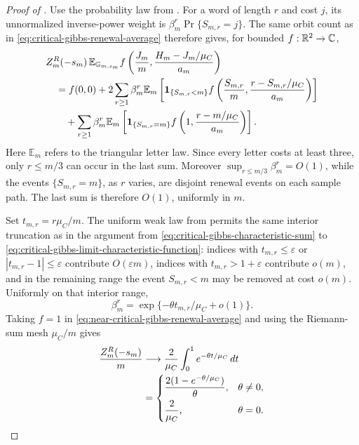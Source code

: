 \begin{proof}[Proof of ]
Use the probability law from .  For a
word of length \(r\) and cost \(j\), its unnormalized inverse-power weight is
\(\beta_m^r\Pr\{S_{m,r}=j\}\).  The same orbit count as in
\eqref{eq:critical-gibbs-renewal-average} therefore gives, for bounded
\(f:\mathbb{R}^2\to\mathbb C\),
\begin{align}
 &Z_m^R(-s_m)\,\mathbb E_{\mathbb G_{m,s_m}}
 f\left(\frac{J_m}{m},\frac{H_m-J_m/\mu_C}{a_m}\right)
 \notag\\
 &\quad=f(0,0)
 +2\sum_{r\ge1}\beta_m^r\mathbb E_m\left[
 \mathbf1_{\{S_{m,r}<m\}}
 f\left(\frac{S_{m,r}}m,
         \frac{r-S_{m,r}/\mu_C}{a_m}\right)\right]
 \notag\\
 &\qquad
 +\sum_{r\ge1}\beta_m^r\mathbb E_m\left[
 \mathbf1_{\{S_{m,r}=m\}}
 f\left(1,\frac{r-m/\mu_C}{a_m}\right)\right].
 \label{eq:near-critical-gibbs-renewal-average}
\end{align}
Here \(\mathbb E_m\) refers to the triangular letter law.  Since every
letter costs at least three, only \(r\le m/3\) can occur in the last sum.
Moreover \(\sup_{r\le m/3}\beta_m^r=O(1)\), while the events
\(\{S_{m,r}=m\}\), as \(r\) varies, are disjoint renewal events on each
sample path.  The last sum is therefore \(O(1)\), uniformly in \(m\).

Set \(t_{m,r}=r\mu_C/m\).  The uniform weak law from
 permits the same interior truncation
as in the argument from \eqref{eq:critical-gibbs-characteristic-sum} to
\eqref{eq:critical-gibbs-limit-characteristic-function}: indices with
\(t_{m,r}\le\varepsilon\) or
\(|t_{m,r}-1|\le\varepsilon\) contribute \(O(\varepsilon m)\), indices
with \(t_{m,r}>1+\varepsilon\) contribute \(o(m)\), and in the remaining
range the event \(S_{m,r}<m\) may be removed at cost \(o(m)\).  Uniformly on
that interior range,
\begin{equation}
 \beta_m^r=\exp\{-\theta t_{m,r}/\mu_C+o(1)\}.
 \label{eq:near-critical-fugacity-limit}
\end{equation}
Taking \(f=1\) in \eqref{eq:near-critical-gibbs-renewal-average} and using
the Riemann-sum mesh \(\mu_C/m\) gives
\begin{align}
 \frac{Z_m^R(-s_m)}m
 &\longrightarrow \frac2{\mu_C}
 \int_0^1e^{-\theta t/\mu_C}\,dt
 \notag\\
 &=\begin{cases}
 \displaystyle\frac{2(1-e^{-\theta/\mu_C})}{\theta},&\theta\ne0,\\[6pt]
 \displaystyle\frac2{\mu_C},&\theta=0.
 \end{cases}
 \label{eq:finite-size-crossover-normalizer-proof}
\end{align}


\end{proof}
